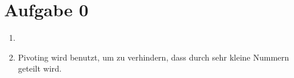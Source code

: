 \section*{Aufgabe 0}

\begin{enumerate}[label=\arabic*)]

    \item 
    \item Pivoting wird benutzt, um zu verhindern, dass durch sehr kleine Nummern geteilt wird. 

\end{enumerate}


